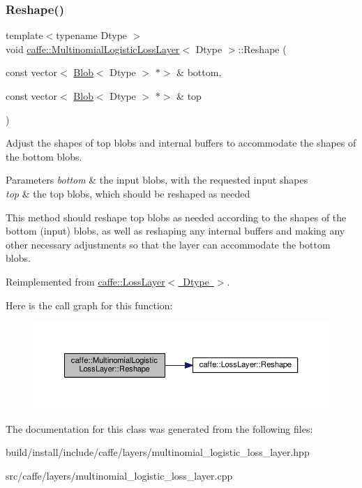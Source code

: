 \subsubsection{\texorpdfstring{Reshape()}{Reshape()}\hspace{0.1cm}{\footnotesize\ttfamily [2/2]}}
{\footnotesize\ttfamily template$<$typename Dtype $>$ \\
void \mbox{\hyperlink{classcaffe_1_1_multinomial_logistic_loss_layer}{caffe\+::\+Multinomial\+Logistic\+Loss\+Layer}}$<$ Dtype $>$\+::Reshape (\begin{DoxyParamCaption}\item[{const vector$<$ \mbox{\hyperlink{classcaffe_1_1_blob}{Blob}}$<$ Dtype $>$ $\ast$$>$ \&}]{bottom,  }\item[{const vector$<$ \mbox{\hyperlink{classcaffe_1_1_blob}{Blob}}$<$ Dtype $>$ $\ast$$>$ \&}]{top }\end{DoxyParamCaption})\hspace{0.3cm}{\ttfamily [virtual]}}



Adjust the shapes of top blobs and internal buffers to accommodate the shapes of the bottom blobs. 


\begin{DoxyParams}{Parameters}
{\em bottom} & the input blobs, with the requested input shapes \\
\hline
{\em top} & the top blobs, which should be reshaped as needed\\
\hline
\end{DoxyParams}
This method should reshape top blobs as needed according to the shapes of the bottom (input) blobs, as well as reshaping any internal buffers and making any other necessary adjustments so that the layer can accommodate the bottom blobs. 

Reimplemented from \mbox{\hyperlink{classcaffe_1_1_loss_layer_abf00412194f5413ea9468ee44b0d986f}{caffe\+::\+Loss\+Layer$<$ Dtype $>$}}.

Here is the call graph for this function\+:
\nopagebreak
\begin{figure}[H]
\begin{center}
\leavevmode
\includegraphics[width=350pt]{classcaffe_1_1_multinomial_logistic_loss_layer_a979be47987712c02dfb57a88b2a69f11_cgraph}
\end{center}
\end{figure}


The documentation for this class was generated from the following files\+:\begin{DoxyCompactItemize}
\item 
build/install/include/caffe/layers/multinomial\+\_\+logistic\+\_\+loss\+\_\+layer.\+hpp\item 
src/caffe/layers/multinomial\+\_\+logistic\+\_\+loss\+\_\+layer.\+cpp\end{DoxyCompactItemize}
